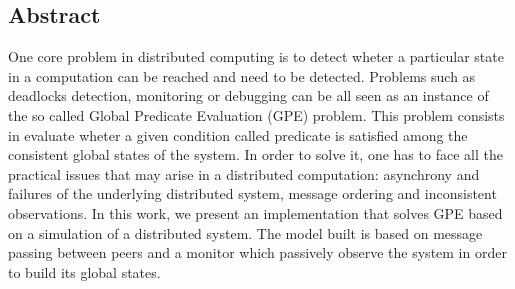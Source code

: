\begin{titlepage}
\section*{Abstract}

One core problem in distributed computing is to detect wheter a particular state in a computation can be reached and need to be detected. Problems such as deadlocks detection, monitoring or debugging can be all seen as an instance of the so called Global Predicate Evaluation (GPE) problem. This problem consists in evaluate wheter a given condition called predicate is satisfied among the consistent global states of the system. In order to solve it, one has to face all the practical issues that may arise in a distributed computation: asynchrony and failures of the underlying distributed system, message ordering and inconsistent observations. In this work, we present an implementation that solves GPE based on a simulation of a distributed system. The model built is based on message passing between peers and a monitor which passively observe the system in order to build its global states.


\end{titlepage}
